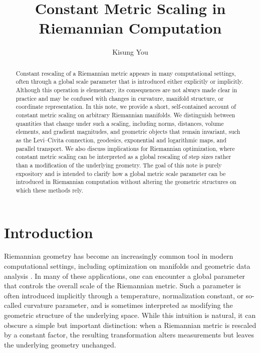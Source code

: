 \documentclass[11pt]{article}
\begin{document}
	
\title{Constant Metric Scaling in Riemannian Computation}
\author[1]{Kisung You}
\date{}

\maketitle
\begin{abstract}
Constant rescaling of a Riemannian metric appears in many computational settings,
often through a global scale parameter that is introduced either explicitly or
implicitly. Although this operation is elementary, its consequences are not
always made clear in practice and may be confused with changes in curvature,
manifold structure, or coordinate representation. In this note, we provide a
short, self-contained account of constant metric scaling on arbitrary Riemannian
manifolds. We distinguish between quantities that change under such a scaling,
including norms, distances, volume elements, and gradient magnitudes, and
geometric objects that remain invariant, such as the Levi--Civita connection,
geodesics, exponential and logarithmic maps, and parallel transport. We also
discuss implications for Riemannian optimization, where constant metric scaling
can be interpreted as a global rescaling of step sizes rather than a
modification of the underlying geometry. The goal of this note is purely
expository and is intended to clarify how a global metric scale parameter can be
introduced in Riemannian computation without altering the geometric structures
on which these methods rely.
\end{abstract}




\section{Introduction}

Riemannian geometry has become an increasingly common tool in modern computational settings, including optimization on manifolds \citep{boumal_2023_IntroductionOptimizationSmooth} and geometric data analysis \citep{bhattacharya_2012_NonparametricInferenceManifolds, patrangenaru_2016_NonparametricStatisticsManifolds}. In many of these applications, one can encounter  a global parameter that controls the overall scale of the Riemannian metric. Such a parameter is often introduced implicitly through a temperature, normalization constant, or so-called curvature parameter, and is sometimes interpreted as modifying the geometric structure of the underlying space. While this intuition is natural, it can obscure a simple but important distinction: when a Riemannian metric is rescaled by a constant factor, the resulting transformation alters measurements but leaves the underlying geometry unchanged.
\end{document}
